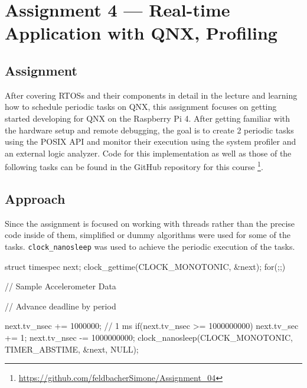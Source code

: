 \chapter{Assignment 4 --- Real-time Application with QNX, Profiling}

\section{Assignment}
After covering RTOSs and their components in detail in the lecture and learning how to schedule periodic tasks on QNX, this assignment focuses on getting started developing for QNX on the Raspberry Pi 4.
After getting familiar with the hardware setup and remote debugging, the goal is to create 2 periodic tasks using the POSIX API and monitor their execution using the system profiler and an external logic analyzer.
Code for this implementation as well as those of the following tasks can be found in the GitHub repository for this course \footnote{\url{https://github.com/feldbacherSimone/Assignment_04}}.

\section{Approach}
Since the assignment is focused on working with threads rather than the precise code inside of them, simplified or dummy algorithms were used for some of the tasks. 
\texttt{clock\_nanosleep} was used to achieve the periodic execution of the tasks.
\begin{CCode} 
struct timespec next; 
clock_gettime(CLOCK_MONOTONIC, &next);
for(;;)
{
	// Sample Accelerometer Data

	// Advance deadline by period

	next.tv_nsec += 1000000; // 1 ms
	if(next.tv_nsec >= 1000000000)
	{
		next.tv_sec += 1;
		next.tv_nsec -= 1000000000;
	}
	clock_nanosleep(CLOCK_MONOTONIC, TIMER_ABSTIME, &next, NULL);
}
\end{CCode}
